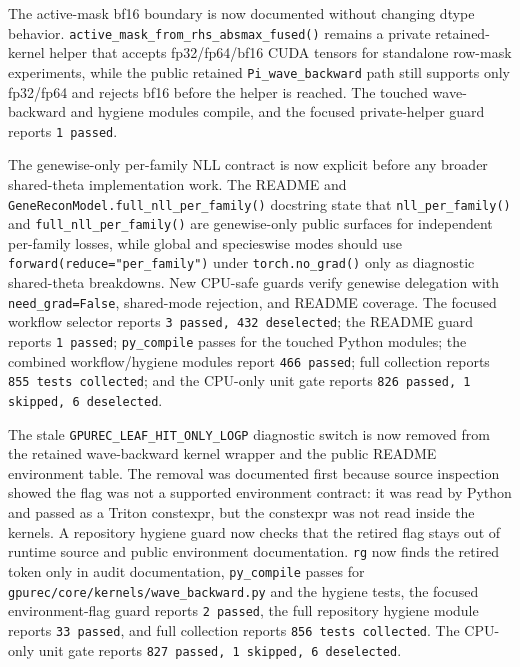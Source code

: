 \documentclass[11pt]{article}
\begin{document}
The active-mask bf16 boundary is now documented without changing dtype
behavior.  \texttt{active\_mask\_from\_rhs\_absmax\_fused()} remains a private
retained-kernel helper that accepts fp32/fp64/bf16 CUDA tensors for standalone
row-mask experiments, while the public retained \texttt{Pi\_wave\_backward}
path still supports only fp32/fp64 and rejects bf16 before the helper is
reached.  The touched wave-backward and hygiene modules compile, and the
focused private-helper guard reports \texttt{1 passed}.

The genewise-only per-family NLL contract is now explicit before any broader
shared-theta implementation work.  The README and
\texttt{GeneReconModel.full\_nll\_per\_family()} docstring state that
\texttt{nll\_per\_family()} and \texttt{full\_nll\_per\_family()} are
genewise-only public surfaces for independent per-family losses, while global
and specieswise modes should use \texttt{forward(reduce="per\_family")} under
\texttt{torch.no\_grad()} only as diagnostic shared-theta breakdowns.  New
CPU-safe guards verify genewise delegation with \texttt{need\_grad=False},
shared-mode rejection, and README coverage.  The focused workflow selector
reports \texttt{3 passed, 432 deselected}; the README guard reports
\texttt{1 passed}; \texttt{py\_compile} passes for the touched Python modules;
the combined workflow/hygiene modules report \texttt{466 passed}; full
collection reports \texttt{855 tests collected}; and the CPU-only unit gate
reports \texttt{826 passed, 1 skipped, 6 deselected}.

The stale \texttt{GPUREC\_LEAF\_HIT\_ONLY\_LOGP} diagnostic switch is now
removed from the retained wave-backward kernel wrapper and the public README
environment table.  The removal was documented first because source inspection
showed the flag was not a supported environment contract: it was read by Python
and passed as a Triton constexpr, but the constexpr was not read inside the
kernels.  A repository hygiene guard now checks that the retired flag stays out
of runtime source and public environment documentation.  \texttt{rg} now finds
the retired token only in audit documentation, \texttt{py\_compile} passes for
\texttt{gpurec/core/kernels/wave\_backward.py} and the hygiene tests, the
focused environment-flag guard reports \texttt{2 passed}, the full repository
hygiene module reports \texttt{33 passed}, and full collection reports
\texttt{856 tests collected}.  The CPU-only unit gate reports
\texttt{827 passed, 1 skipped, 6 deselected}.
\end{document}
